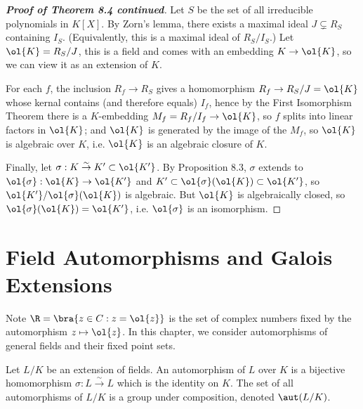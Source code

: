 \begin{proof}[\bf Proof of Theorem 8.4 continued]
Let $S$ be the set of all irreducible polynomials in $K[X]$. By Zorn's lemma, there exists a maximal ideal $J \subsetneq R_S$ containing $I_S$. (Equivalently, this is a maximal ideal of $R_S/I_S$.) Let $\ol{K} = R_S/J$, this is a field and comes with an embedding $K \to \ol{K}$, so we can view it as an extension of $K$.

For each $f$, the inclusion $R_f \to R_S$ gives a homomorphism $R_f \to R_S/J = \ol{K}$ whose kernal contains (and therefore equals) $I_f$, hence by the First Isomorphism Theorem there is a $K$-embedding $M_f = R_f /I_f \to \ol{K}$, so $f$ splits into linear factors in $\ol{K}$; and $\ol{K}$ is generated by the image of the $M_f$, so $\ol{K}$ is algebraic over $K$, i.e. $\ol{K}$ is an algebraic closure of $K$.

Finally, let $\sigma : K \stackrel{\sim}{\to} K' \subset \ol{K'}$. By Proposition 8.3, $\sigma$ extends to $\ol{\sigma}: \ol{K} \to \ol{K'}$ and $K' \subset \ol{\sigma}(\ol{K}) \subset \ol{K'}$, so $\ol{K'}/\ol{\sigma}(\ol{K})$ is algebraic. But $\ol{K}$ is algebraically closed, so $\ol{\sigma}(\ol{K}) = \ol{K'}$, i.e. $\ol{\sigma}$ is an isomorphism.
\end{proof}


\section{Field Automorphisms and Galois Extensions}

Note $\R = \bra{z \in C : z = \ol{z}}$ is the set of complex numbers fixed by the automorphism $z \mapsto \ol{z}$. In this chapter, we consider automorphisms of general fields and their fixed point sets.

\begin{definition}
Let $L/K$ be an extension of fields. An automorphism of $L$ over $K$ is a bijective homomorphism $\sigma : L \stackrel{\sim}{\to} L$ which is the identity on $K$. The set of all automorphisms of $L/K$ is a group under composition, denoted $\aut(L/K)$.
\end{definition}

